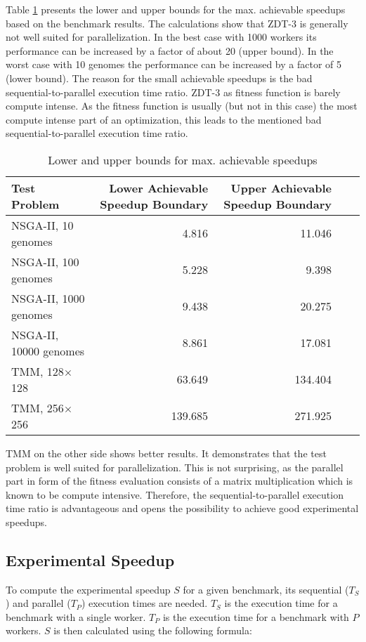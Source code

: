 Table \ref{table:achievable_speedups} presents the lower and upper bounds for the max. achievable speedups based on the benchmark results. The calculations show that ZDT-3 is generally not well suited for parallelization. In the best case with 1000 workers its performance can be increased by a factor of about 20 (upper bound). In the worst case with 10 genomes the performance can be increased by a factor of 5 (lower bound). The reason for the small achievable speedups is the bad sequential-to-parallel execution time ratio. ZDT-3 as fitness function is barely compute intense. As the fitness function is usually (but not in this case) the most compute intense part of an optimization, this leads to the mentioned bad sequential-to-parallel execution time ratio.

\begin{table}
  \centering
  \caption{Lower and upper bounds for max. achievable speedups}
  \begin{tabular}{lrrrr}\toprule[2pt]
    Test Problem & \parbox[r]{3.5cm}{Lower Achievable Speedup Boundary}& \parbox[r]{3.5cm}{Upper Achievable Speedup Boundary}\\ \midrule
    NSGA-II, 10 genomes & 4.816 & 11.046 \\
    NSGA-II, 100 genomes & 5.228 & 9.398 \\
    NSGA-II, 1000 genomes & 9.438 & 20.275 \\
    NSGA-II, 10000 genomes & 8.861 & 17.081 \\
    TMM, 128$\times$128 & 63.649 & 134.404 \\
    TMM, 256$\times$256 & 139.685 & 271.925 \\ \bottomrule[2pt]
  \end{tabular}
  \label{table:achievable_speedups}
\end{table}

TMM on the other side shows better results. It demonstrates that the test problem is well suited for parallelization. This is not surprising, as the parallel part in form of the fitness evaluation consists of a matrix multiplication which is known to be compute intensive. Therefore, the sequential-to-parallel execution time ratio is advantageous and opens the possibility to achieve good experimental speedups.

\subsection{Experimental Speedup}
\label{chap:evaluation:exp_speedup}
To compute the experimental speedup $S$ for a given benchmark, its sequential ($T_S$) and parallel ($T_P$) execution times are needed. $T_S$ is the execution time for a benchmark with a single worker. $T_P$ is the execution time for a benchmark with $P$ workers. $S$ is then calculated using the following formula:

